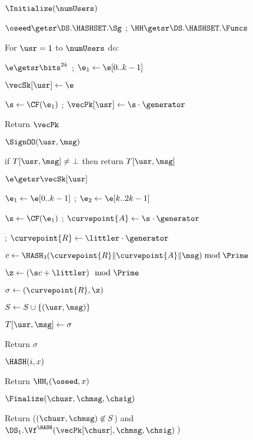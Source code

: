 \begin{figure}
	{
		
		\begin{oracle}{$\Initialize(\numUsers)$}
			\item $\oseed\getsr\DS.\HASHSET.\Sg$ ; 
			$\HH \getsr \DS.\HASHSET.\Funcs$
			\item For $\usr=1$ to $\numUsers$ do:
			\item \quad $\e\getsr \bits^{2k}$ ; $\e_1 \gets \e[0..k-1]$ 
			\item \quad $\vecSk[\usr] \gets \e$
			\item \quad $\s \gets \CF(\e_1)$ ; $\vecPk[\usr] \gets \s\cdot \generator$
			\item Return $\vecPk$
		\end{oracle}
		\ExptSepSpace
		
		\begin{oracle}{$\SignOO(\usr, \msg)$}
			\item if $T[\usr, \msg] \neq \bot$ then return $T[\usr, \msg]$
			\item $\e\getsr \vecSk[\usr]$ 
			\item $\e_1 \gets \e[0..k-1]$ ; $\e_2 \gets \e[k..2k-1]$ 
			\item $\s \gets \CF(\e_1)$ ; $\curvepoint{A} \gets \s\cdot \generator$
			\item {}
			; $\curvepoint{R} \gets \littler\cdot \generator$
			\item $c \gets \HASH_3(\curvepoint{R}\|\curvepoint{A}\|\msg) \bmod \Prime$
			\item $\z \gets (\s c + \littler) \mod \Prime$
			\item $\sigma \gets (\curvepoint{R},\z)$
			\item $S \gets S \cup \{(\usr, \msg)\}$
			\item $T[\usr, \msg] \gets \sigma$
			\item Return $\sigma$
		\end{oracle}
		\ExptSepSpace
		
		\begin{oracle}{$\HASH(i,x)$}
			\item Return $\HH_i(\oseed,x)$
		\end{oracle}
		\ExptSepSpace
		
		\begin{oracle}{$\Finalize(\chusr, \chmsg, \chsig)$}
			\item Return ($(\chusr,\chmsg) \not\in S$) and $\DS_1.\Vf^{\HASH}(\vecPk[\chusr], \chmsg, \chsig)\:$) \vspace{2pt}
		\end{oracle}
	}
	{
		
}
\end{figure}
